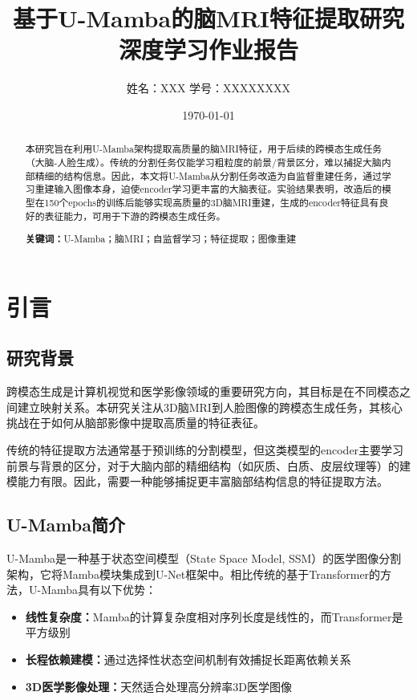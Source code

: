 \documentclass[11pt,a4paper]{article}
\title{\textbf{基于U-Mamba的脑MRI特征提取研究} \\
\large 深度学习作业报告}
\author{姓名：XXX \quad 学号：XXXXXXXX}
\date{\today}
\begin{document}
\maketitle

\begin{abstract}
本研究旨在利用U-Mamba架构提取高质量的脑MRI特征，用于后续的跨模态生成任务（大脑-人脸生成）。传统的分割任务仅能学习粗粒度的前景/背景区分，难以捕捉大脑内部精细的结构信息。因此，本文将U-Mamba从分割任务改造为自监督重建任务，通过学习重建输入图像本身，迫使encoder学习更丰富的大脑表征。实验结果表明，改造后的模型在150个epochs的训练后能够实现高质量的3D脑MRI重建，生成的encoder特征具有良好的表征能力，可用于下游的跨模态生成任务。

\textbf{关键词：}U-Mamba；脑MRI；自监督学习；特征提取；图像重建
\end{abstract}

\section{引言}

\subsection{研究背景}

跨模态生成是计算机视觉和医学影像领域的重要研究方向，其目标是在不同模态之间建立映射关系。本研究关注从3D脑MRI到人脸图像的跨模态生成任务，其核心挑战在于如何从脑部影像中提取高质量的特征表征。

传统的特征提取方法通常基于预训练的分割模型，但这类模型的encoder主要学习前景与背景的区分，对于大脑内部的精细结构（如灰质、白质、皮层纹理等）的建模能力有限。因此，需要一种能够捕捉更丰富脑部结构信息的特征提取方法。

\subsection{U-Mamba简介}

U-Mamba是一种基于状态空间模型（State Space Model, SSM）的医学图像分割架构\cite{umamba}，它将Mamba模块集成到U-Net框架中。相比传统的基于Transformer的方法，U-Mamba具有以下优势：

\begin{itemize}
    \item \textbf{线性复杂度：}Mamba的计算复杂度相对序列长度是线性的，而Transformer是平方级别
    \item \textbf{长程依赖建模：}通过选择性状态空间机制有效捕捉长距离依赖关系
    \item \textbf{3D医学影像处理：}天然适合处理高分辨率3D医学图像
\end{itemize}
\end{document}
